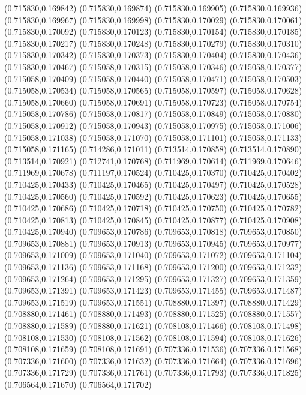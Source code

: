(0.715830,0.169842)
(0.715830,0.169874)
(0.715830,0.169905)
(0.715830,0.169936)
(0.715830,0.169967)
(0.715830,0.169998)
(0.715830,0.170029)
(0.715830,0.170061)
(0.715830,0.170092)
(0.715830,0.170123)
(0.715830,0.170154)
(0.715830,0.170185)
(0.715830,0.170217)
(0.715830,0.170248)
(0.715830,0.170279)
(0.715830,0.170310)
(0.715830,0.170342)
(0.715830,0.170373)
(0.715830,0.170404)
(0.715830,0.170436)
(0.715830,0.170467)
(0.715058,0.170315)
(0.715058,0.170346)
(0.715058,0.170377)
(0.715058,0.170409)
(0.715058,0.170440)
(0.715058,0.170471)
(0.715058,0.170503)
(0.715058,0.170534)
(0.715058,0.170565)
(0.715058,0.170597)
(0.715058,0.170628)
(0.715058,0.170660)
(0.715058,0.170691)
(0.715058,0.170723)
(0.715058,0.170754)
(0.715058,0.170786)
(0.715058,0.170817)
(0.715058,0.170849)
(0.715058,0.170880)
(0.715058,0.170912)
(0.715058,0.170943)
(0.715058,0.170975)
(0.715058,0.171006)
(0.715058,0.171038)
(0.715058,0.171070)
(0.715058,0.171101)
(0.715058,0.171133)
(0.715058,0.171165)
(0.714286,0.171011)
(0.713514,0.170858)
(0.713514,0.170890)
(0.713514,0.170921)
(0.712741,0.170768)
(0.711969,0.170614)
(0.711969,0.170646)
(0.711969,0.170678)
(0.711197,0.170524)
(0.710425,0.170370)
(0.710425,0.170402)
(0.710425,0.170433)
(0.710425,0.170465)
(0.710425,0.170497)
(0.710425,0.170528)
(0.710425,0.170560)
(0.710425,0.170592)
(0.710425,0.170623)
(0.710425,0.170655)
(0.710425,0.170686)
(0.710425,0.170718)
(0.710425,0.170750)
(0.710425,0.170782)
(0.710425,0.170813)
(0.710425,0.170845)
(0.710425,0.170877)
(0.710425,0.170908)
(0.710425,0.170940)
(0.709653,0.170786)
(0.709653,0.170818)
(0.709653,0.170850)
(0.709653,0.170881)
(0.709653,0.170913)
(0.709653,0.170945)
(0.709653,0.170977)
(0.709653,0.171009)
(0.709653,0.171040)
(0.709653,0.171072)
(0.709653,0.171104)
(0.709653,0.171136)
(0.709653,0.171168)
(0.709653,0.171200)
(0.709653,0.171232)
(0.709653,0.171264)
(0.709653,0.171295)
(0.709653,0.171327)
(0.709653,0.171359)
(0.709653,0.171391)
(0.709653,0.171423)
(0.709653,0.171455)
(0.709653,0.171487)
(0.709653,0.171519)
(0.709653,0.171551)
(0.708880,0.171397)
(0.708880,0.171429)
(0.708880,0.171461)
(0.708880,0.171493)
(0.708880,0.171525)
(0.708880,0.171557)
(0.708880,0.171589)
(0.708880,0.171621)
(0.708108,0.171466)
(0.708108,0.171498)
(0.708108,0.171530)
(0.708108,0.171562)
(0.708108,0.171594)
(0.708108,0.171626)
(0.708108,0.171659)
(0.708108,0.171691)
(0.707336,0.171536)
(0.707336,0.171568)
(0.707336,0.171600)
(0.707336,0.171632)
(0.707336,0.171664)
(0.707336,0.171696)
(0.707336,0.171729)
(0.707336,0.171761)
(0.707336,0.171793)
(0.707336,0.171825)
(0.706564,0.171670)
(0.706564,0.171702)
